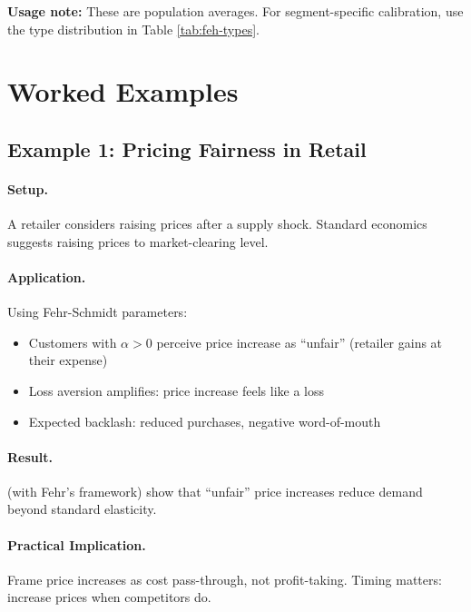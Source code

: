 \textbf{Usage note:} These are population averages. For segment-specific
calibration, use the type distribution in Table \ref{tab:feh-types}.


\section{Worked Examples}
\label{sec:feh-examples}

\subsection{Example 1: Pricing Fairness in Retail}

\paragraph{Setup.} A retailer considers raising prices after a supply shock.
Standard economics suggests raising prices to market-clearing level.

\paragraph{Application.} Using Fehr-Schmidt parameters:
\begin{itemize}[nosep]
    \item Customers with $\alpha > 0$ perceive price increase as ``unfair''
          (retailer gains at their expense)
    \item Loss aversion amplifies: price increase feels like a loss
    \item Expected backlash: reduced purchases, negative word-of-mouth
\end{itemize}

\paragraph{Result.} \citet{kahneman1986fairness} (with Fehr's framework)
show that ``unfair'' price increases reduce demand beyond standard elasticity.

\paragraph{Practical Implication.} Frame price increases as cost pass-through,
not profit-taking. Timing matters: increase prices when competitors do.

